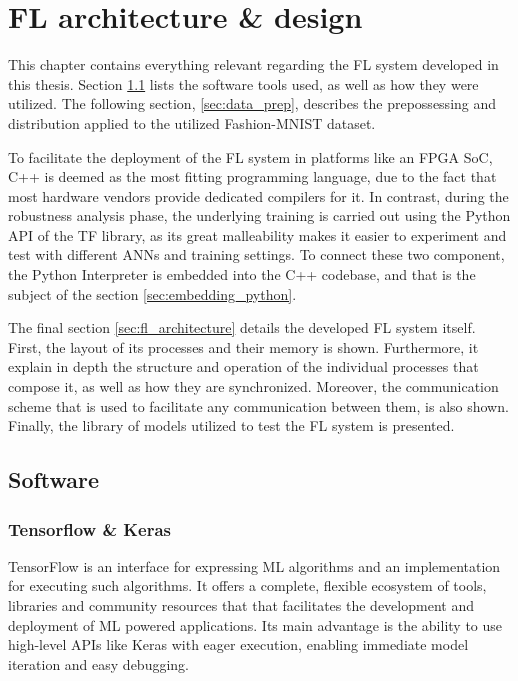 \chapter{FL architecture \& design} %
\label{Chapter-FL-architecture-design}
This chapter contains everything relevant regarding the FL system developed in this thesis. Section \ref{sec:software} lists the software tools used, as well as how they were utilized. The following section, \ref{sec:data_prep}, describes the prepossessing and distribution applied to the utilized Fashion-MNIST dataset.

To facilitate the deployment of the FL system in platforms like an FPGA SoC, C++ is deemed as the most fitting programming language, due to the fact that most hardware vendors provide dedicated compilers for it. In contrast, during the robustness analysis phase, the underlying training is carried out using the Python API of the TF library, as its great malleability makes it easier to experiment and test with different ANNs and training settings. To connect these two component, the Python Interpreter is embedded into the C++ codebase, and that is the subject of the section \ref{sec:embedding_python}.

The final section \ref{sec:fl_architecture} details the developed FL system itself. First, the layout of its processes and their memory is shown. Furthermore, it explain in depth the structure and operation of the individual processes that compose it, as well as how they are synchronized. Moreover, the communication scheme that is used to facilitate any communication between them, is also shown. Finally, the library of models utilized to test the FL system is presented.

\section{Software}
\label{sec:software}
\subsection{Tensorflow \& Keras}
TensorFlow \cite{tensorflow2015-whitepaper} is an interface for expressing ML algorithms and an implementation for executing such algorithms. It offers a complete, flexible ecosystem of tools, libraries and community resources that that facilitates the development and deployment of ML powered applications. Its main advantage is the ability to use high-level APIs like Keras with eager execution, enabling immediate model iteration and easy debugging. 

